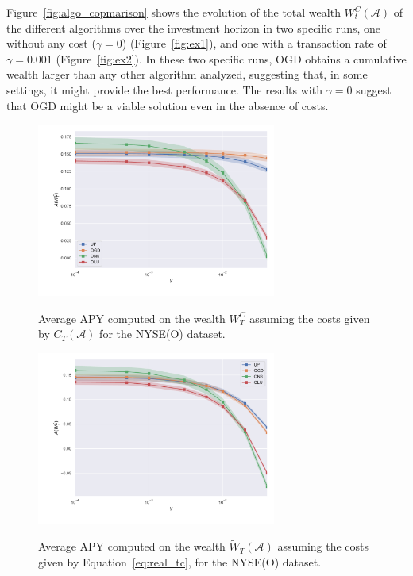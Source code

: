 Figure~\ref{fig:algo_copmarison} shows the evolution of the total wealth ${W}^C_t(\mathcal{A})$ of the different algorithms over the investment horizon in two specific runs, one without any cost ($\gamma = 0$) (Figure~\ref{fig:ex1}), and one with a transaction rate of $\gamma = 0.001$ (Figure~\ref{fig:ex2}).
In these two specific runs, OGD obtains a cumulative wealth larger than any other algorithm analyzed, suggesting that, in some settings, it might provide the best performance.
The results with $\gamma = 0$ suggest that OGD might be a viable solution even in the absence of costs.


\begin{figure}[ht!]
\centering
{\includegraphics[width=0.70\textwidth,keepaspectratio]{img/fig_w_decay_l1.pdf}} 
\caption{Average APY computed on the wealth $W_T^C$ assuming the costs given by $C_T(\mathcal{A})$ for the NYSE(O) dataset.}
\label{fig:wealth_decay_l1}
\end{figure}

\begin{figure}[ht!]
\centering
{\includegraphics[width=0.70\textwidth,keepaspectratio]{img/fig_w_decay_true.pdf}} 
\caption{ Average APY computed on the wealth $\tilde{W}_T(\mathcal A)$ assuming the costs given by Equation~\eqref{eq:real_tc}, for the NYSE(O) dataset.}
\label{fig:wealth_decay_true}
\end{figure}


